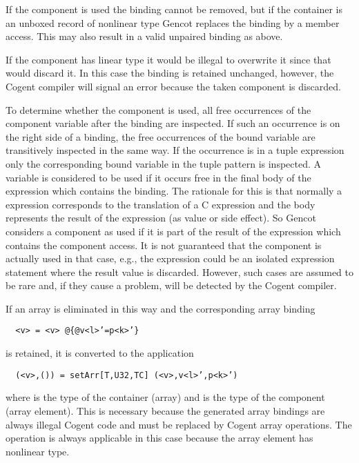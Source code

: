 If the component is used the  binding cannot be removed, but if the container is an unboxed record of nonlinear type
Gencot replaces the  binding by a member access. This may also result in a valid unpaired  binding as above.

If the component has linear type it would be illegal to overwrite it since that would discard it. In this case the 
binding is retained unchanged, however, the Cogent compiler will signal an error because the taken component is discarded.

To determine whether the component is used, all free occurrences of the component variable after the  binding are
inspected. If such an occurrence is on the right side of a binding, the free occurrences of the bound variable are transitively
inspected in the same way. If the occurrence is in a tuple expression only the corresponding bound variable in the tuple pattern
is inspected. A variable is considered to be used if it occurs free in the final body of the  expression
which contains the  binding. The rationale for this is that normally a  expression corresponds to the
translation of a C expression and the body represents the result of the expression (as value or side effect). So Gencot considers
a component as used if it is part of the result of the expression which contains the component access. It is not guaranteed that
the component is actually used in that case, e.g., the expression could be an isolated expression statement where the result value is
discarded. However, such cases are assumed to be rare and, if they cause a problem, will be detected by the Cogent compiler.

If an array  is eliminated in this way and the corresponding array  binding
\begin{verbatim}
  <v> = <v> @{@v<l>’=p<k>’}
\end{verbatim}
is retained, it is converted to the  application
\begin{verbatim}
  (<v>,()) = setArr[T,U32,TC] (<v>,v<l>’,p<k>’)
\end{verbatim}
where  is the type of the container (array) and  is the type of the component (array element).
This is necessary because the generated array  bindings are always illegal Cogent code and must be replaced
by Cogent array operations. The  operation is always applicable in this case because the array element has
nonlinear type.

